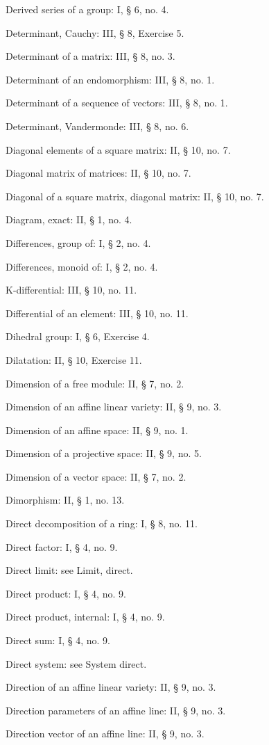 Derived series of a group: I, § 6, no. 4.

Determinant, Cauchy: III, § 8, Exercise 5.

Determinant of a matrix: III, § 8, no. 3.

Determinant of an endomorphism: III, § 8, no. 1.

Determinant of a sequence of vectors: III, § 8, no. 1.

Determinant, Vandermonde: III, § 8, no. 6.

Diagonal elements of a square matrix: II, § 10, no. 7.

Diagonal matrix of matrices: II, § 10, no. 7.

Diagonal of a square matrix, diagonal matrix: II, § 10, no. 7.

Diagram, exact: II, § 1, no. 4.

Differences, group of: I, § 2, no. 4.

Differences, monoid of: I, § 2, no. 4.

K-differential: III, § 10, no. 11.

Differential of an element: III, § 10, no. 11.

Dihedral group: I, § 6, Exercise 4.

Dilatation: II, § 10, Exercise 11.

Dimension of a free module: II, § 7, no. 2.

Dimension of an affine linear variety: II, § 9, no. 3.

Dimension of an affine space: II, § 9, no. 1.

Dimension of a projective space: II, § 9, no. 5.

Dimension of a vector space: II, § 7, no. 2.

Dimorphism: II, § 1, no. 13.

Direct decomposition of a ring: I, § 8, no. 11.

Direct factor: I, § 4, no. 9.

Direct limit: see Limit, direct.

Direct product: I, § 4, no. 9.

Direct product, internal: I, § 4, no. 9.

Direct sum: I, § 4, no. 9.

Direct system: see System direct.

Direction of an affine linear variety: II, § 9, no. 3.

Direction parameters of an affine line: II, § 9, no. 3.

Direction vector of an affine line: II, § 9, no. 3.

